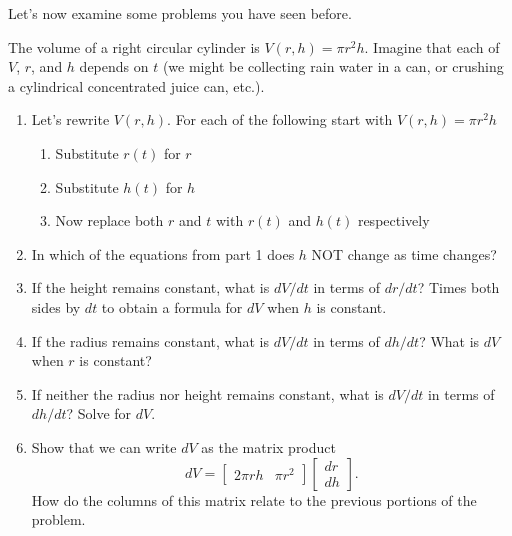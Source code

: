 Let's now examine some problems you have seen before. 
\begin{problem}\label{prob:differential for volume of a cylinder}%
%
 The volume of a right circular cylinder is $V(r,h)= \pi r^2 h$.  Imagine that each of $V$, $r$, and $h$ depends on $t$ (we might be collecting rain water in a can, or crushing a cylindrical concentrated juice can, etc.).  
\begin{enumerate}
	\item Let's rewrite $V(r,h)$. For each of the following start with $V(r,h)=\pi r^2 h$
	\begin{enumerate}
		\item Substitute $r(t)$ for $r$
		\item Substitute $h(t)$ for $h$
		\item Now replace both $r$ and $t$ with $r(t)$ and $h(t)$ respectively
	\end{enumerate}
	\item In which of the equations from part 1 does $h$ NOT change as time changes?
	\item If the height remains constant, what is $dV/dt$ in terms of $dr/dt$? Times both sides by $dt$ to obtain a formula for $dV$ when $h$ is constant.
	\item If the radius remains constant, what is $dV/dt$ in terms of $dh/dt$? What is $dV$ when $r$ is constant?
	\item If neither the radius nor height remains constant, what is $dV/dt$ in terms of $dh/dt$? Solve for $dV$.
	\item%
%
Show that we can write $dV$ as the matrix product 
$$dV = \begin{bmatrix}2\pi rh& \pi r^2\end{bmatrix}\begin{bmatrix}dr\\dh\end{bmatrix}.$$ 
How do the columns of this matrix relate to the previous portions of the problem.
\end{enumerate}
\end{problem}


